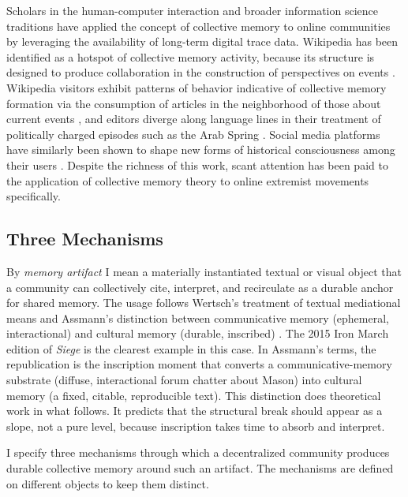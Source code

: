 \documentclass[bibtex,autowc,nonblind]{apsr_submission}
\begin{document}
Scholars in the human-computer interaction and broader information science traditions have applied the concept of collective memory to online communities by leveraging the availability of long-term digital trace data. Wikipedia has been identified as a hotspot of collective memory activity, because its structure is designed to produce collaboration in the construction of perspectives on events \citep{pentzold2009fixing, ferron2011collective, keegan2013hot}. Wikipedia visitors exhibit patterns of behavior indicative of collective memory formation via the consumption of articles in the neighborhood of those about current events \citep{garcia2017memory}, and editors diverge along language lines in their treatment of politically charged episodes such as the Arab Spring \citep{jones2024crosslanguageevolutiondivergentcollective}. Social media platforms have similarly been shown to shape new forms of historical consciousness among their users \citep{birkner2020collective, yasseri2022collective}. Despite the richness of this work, scant attention has been paid to the application of collective memory theory to online extremist movements specifically.

\subsection{Three Mechanisms}

By \textit{memory artifact} I mean a materially instantiated textual or visual object that a community can collectively cite, interpret, and recirculate as a durable anchor for shared memory. The usage follows Wertsch's treatment of textual mediational means \citep{wertsch2018collective} and Assmann's distinction between communicative memory (ephemeral, interactional) and cultural memory (durable, inscribed) \citep{assmann1995collective}. The 2015 Iron March edition of \textit{Siege} is the clearest example in this case. In Assmann's terms, the republication is the inscription moment that converts a communicative-memory substrate (diffuse, interactional forum chatter about Mason) into cultural memory (a fixed, citable, reproducible text). This distinction does theoretical work in what follows. It predicts that the structural break should appear as a slope, not a pure level, because inscription takes time to absorb and interpret.

I specify three mechanisms through which a decentralized community produces durable collective memory around such an artifact. The mechanisms are defined on different objects to keep them distinct.
\end{document}
